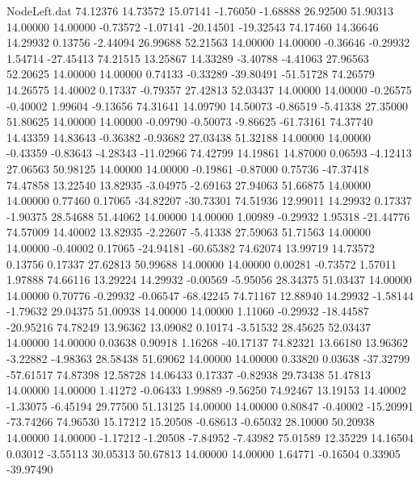\begin{filecontents}{NodeLeft.dat}
  74.12376   14.73572   15.07141    -1.76050   -1.68888   26.92500   51.90313   14.00000   14.00000   -0.73572   -1.07141  -20.14501  -19.32543
  74.17460   14.36646   14.29932     0.13756   -2.44094   26.99688   52.21563   14.00000   14.00000   -0.36646   -0.29932    1.54714  -27.45413
  74.21515   13.25867   14.33289    -3.40788   -4.41063   27.96563   52.20625   14.00000   14.00000    0.74133   -0.33289  -39.80491  -51.51728
  74.26579   14.26575   14.40002     0.17337   -0.79357   27.42813   52.03437   14.00000   14.00000   -0.26575   -0.40002    1.99604   -9.13656
  74.31641   14.09790   14.50073    -0.86519   -5.41338   27.35000   51.80625   14.00000   14.00000   -0.09790   -0.50073   -9.86625  -61.73161
  74.37740   14.43359   14.83643    -0.36382   -0.93682   27.03438   51.32188   14.00000   14.00000   -0.43359   -0.83643   -4.28343  -11.02966
  74.42799   14.19861   14.87000     0.06593   -4.12413   27.06563   50.98125   14.00000   14.00000   -0.19861   -0.87000    0.75736  -47.37418
  74.47858   13.22540   13.82935    -3.04975   -2.69163   27.94063   51.66875   14.00000   14.00000    0.77460    0.17065  -34.82207  -30.73301
  74.51936   12.99011   14.29932     0.17337   -1.90375   28.54688   51.44062   14.00000   14.00000    1.00989   -0.29932    1.95318  -21.44776
  74.57009   14.40002   13.82935    -2.22607   -5.41338   27.59063   51.71563   14.00000   14.00000   -0.40002    0.17065  -24.94181  -60.65382
  74.62074   13.99719   14.73572     0.13756    0.17337   27.62813   50.99688   14.00000   14.00000    0.00281   -0.73572    1.57011    1.97888
  74.66116   13.29224   14.29932    -0.00569   -5.95056   28.34375   51.03437   14.00000   14.00000    0.70776   -0.29932   -0.06547  -68.42245
  74.71167   12.88940   14.29932    -1.58144   -1.79632   29.04375   51.00938   14.00000   14.00000    1.11060   -0.29932  -18.44587  -20.95216
  74.78249   13.96362   13.09082     0.10174   -3.51532   28.45625   52.03437   14.00000   14.00000    0.03638    0.90918    1.16268  -40.17137
  74.82321   13.66180   13.96362    -3.22882   -4.98363   28.58438   51.69062   14.00000   14.00000    0.33820    0.03638  -37.32799  -57.61517
  74.87398   12.58728   14.06433     0.17337   -0.82938   29.73438   51.47813   14.00000   14.00000    1.41272   -0.06433    1.99889   -9.56250
  74.92467   13.19153   14.40002    -1.33075   -6.45194   29.77500   51.13125   14.00000   14.00000    0.80847   -0.40002  -15.20991  -73.74266
  74.96530   15.17212   15.20508    -0.68613   -0.65032   28.10000   50.20938   14.00000   14.00000   -1.17212   -1.20508   -7.84952   -7.43982
  75.01589   12.35229   14.16504     0.03012   -3.55113   30.05313   50.67813   14.00000   14.00000    1.64771   -0.16504    0.33905  -39.97490

\end{filecontents}
